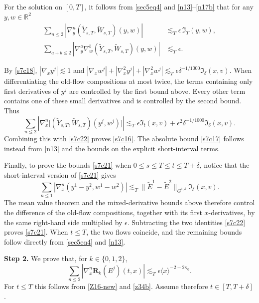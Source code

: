 \documentclass[reqno,11pt]{amsart}
\numberwithin{equation}{section}
\def\R{{\mathbb R}}
\def\R{{\bf R}}
\def\R{\mathbb{R}}
\begin{document}
For the solution on $[0,T]$, it follows from \eqref{sec5eq4} and
\eqref{n13}--\eqref{n17b} that for any $y,w\in\R^2$
\begin{align*}
\sum_{n\leq2}
|\nabla_y^n(\widetilde Y_{s,T},\widetilde W_{s,T})(y,w)|
&\lesssim_T\epsilon\,\mathfrak I_T(y,w),\\
\sum_{a+b\leq2}
|\nabla_y^a\nabla_w^b
(\widetilde Y_{s,T},\widetilde W_{s,T})(y,w)|
&\lesssim_T\epsilon.
\end{align*}


By \eqref{s7c18}, $|\nabla_xy^j|\lesssim1$ and 
$|\nabla_xw^j|+|\nabla_x^2y^j|+|\nabla_x^2w^j|\lesssim_T\epsilon\delta^{-1/1000}\mathfrak I_\delta(x,v)$.
When differentiating the old-flow compositions at most twice, the terms
containing only first derivatives of $y^j$ are controlled by the first
bound above. Every other term contains one of these small derivatives
and is controlled by the second bound. Thus
\[
\sum_{n\leq2}
\left|\nabla_x^n
\big[(\widetilde Y_{s,T},\widetilde W_{s,T})(y^j,w^j)\big]\right|
\lesssim_T
\epsilon\mathfrak I_t(x,v)
+\epsilon^2\delta^{-1/1000}\mathfrak I_\delta(x,v).
\]
Combining this with \eqref{s7c22} proves \eqref{s7c16}.
The absolute bound \eqref{s7c17} follows instead from \eqref{n13}
and the bounds on the explicit short-interval terms.

Finally, to prove the bounds \eqref{s7c21} when $0\leq s\leq T\leq t\leq T+\delta$, notice that the short-interval version of \eqref{s7c21} gives
\[
\sum_{n\leq1}
|\nabla_x^n(y^1-y^2,w^1-w^2)|
\lesssim_T
\|\tilde E^1-\tilde E^2\|_{G^{1,\delta}}\mathfrak I_\delta(x,v).
\]
The mean value theorem and the mixed-derivative bounds above therefore
control the difference of the old-flow compositions, together with
its first $x$-derivatives, by the same right-hand side multiplied by
$\epsilon$. Subtracting the two identities \eqref{s7c22} proves
\eqref{s7c21}. When $t\leq T$, the two flows coincide, and the remaining
bounds follow directly from \eqref{sec5eq4} and \eqref{n13}.
\medskip

\textbf{Step 2.} We prove that, for $k\in\{0,1,2\}$,
\begin{equation}\label{s7c23}
\sum_{n\leq2}|\nabla_x^n\mathbf R_k(E^j)(t,x)|
\lesssim_T\epsilon\langle x\rangle^{-2-2\kappa_0}.
\end{equation}
For $t\leq T$ this follows from \eqref{Z16-new} and \eqref{z34b}.
Assume therefore $t\in[T,T+\delta]$.
\end{document}
